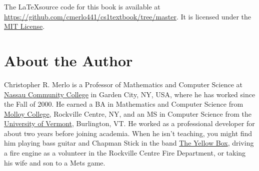 The \LaTeX source code for this book is available at \href{https://github.com/cmerlo441/cs1textbook/tree/master}{https://github.com/cmerlo441/cs1textbook/tree/master}.  It is licensed under the \href{https://github.com/cmerlo441/cs1textbook/blob/master/LICENSE}{MIT License}.

\section*{About the Author}

Christopher R. Merlo is a Professor of Mathematics and Computer Science at \href{http://www.matcmp.ncc.edu/~cmerlo/}{Nassau Community College} in Garden City, NY, USA, where he has worked since the Fall of 2000.  He earned a BA in Mathematics and Computer Science from \href{http://www.molloy.edu/}{Molloy College}, Rockville Centre, NY, and an MS in Computer Science from the \href{http://www.uvm.edu/cems/cs}{University of Vermont}, Burlington, VT.  He worked as a professional developer for about two years before joining academia.  When he isn't teaching, you might find him playing bass guitar and Chapman Stick in the band \href{http://www.theyellowbox.com/}{The Yellow Box}, driving a fire engine as a volunteer in the Rockville Centre Fire Department, or taking his wife and son to a Mets game.
